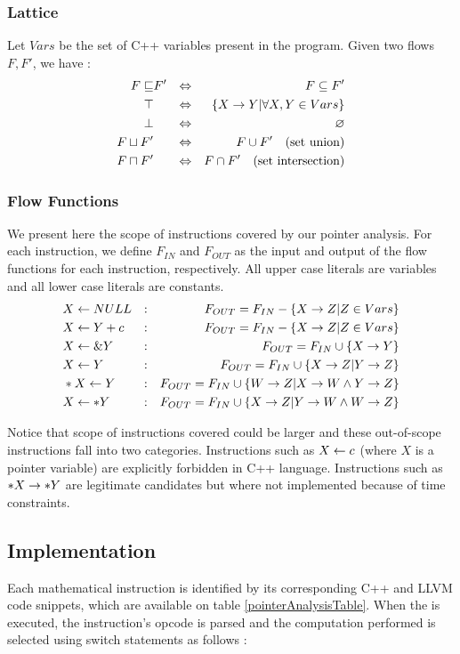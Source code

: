 \subsubsection{Lattice}
Let $Vars$ be the set of C++ variables present in the program. Given two flows $F,F'$, we have :
\begin{align*}
F \sqsubseteq & F'  & \Leftrightarrow & & F \subseteq F' \\
\top & & \Leftrightarrow & & \{ X \rightarrow Y | \forall X,Y \in Vars \}\\ 
\bot & & \Leftrightarrow & & \varnothing \\ 
F \sqcup F' & & \Leftrightarrow &  & F \cup F' \quad \text{(set union)} \\
F \sqcap F' & & \Leftrightarrow & & F \cap F' \quad \text{(set intersection)}
\end{align*}
\subsubsection{Flow Functions}
We present here the scope of instructions covered by our pointer analysis. For each instruction, we define $F_{IN}$ and $F_{OUT}$ as the input and output of the flow functions for each instruction, respectively. All upper case literals are variables and all lower case literals are constants.
{\footnotesize
\begin{align*} 
& X \leftarrow NULL & : & & F_{OUT} = F_{IN} - \{X \rightarrow Z | Z \in Vars \} \\
& X \leftarrow Y + c & : & & F_{OUT} = F_{IN} - \{X \rightarrow Z | Z \in Vars \} \\
& X \leftarrow \&Y & : & & F_{OUT} = F_{IN} \cup \{X \rightarrow Y \} \\
& X \leftarrow Y & : & & F_{OUT} = F_{IN} \cup \{X \rightarrow Z | Y \rightarrow Z \} \\
& *X \leftarrow Y & : & & F_{OUT} = F_{IN} \cup \{W \rightarrow Z | X \rightarrow W \wedge Y \rightarrow Z \} \\
& X \leftarrow *Y & : & & F_{OUT} = F_{IN} \cup \{X \rightarrow Z | Y \rightarrow W \wedge W \rightarrow Z \} 
\end{align*}
}%

Notice that scope of instructions covered could be larger and these out-of-scope instructions fall into two categories. Instructions such as $X \leftarrow c$ (where $X$ is a pointer variable) are explicitly forbidden in C++ language. Instructions such as $*X \rightarrow *Y$ are legitimate candidates but where not implemented because of time constraints. 
\subsection{Implementation}
Each mathematical instruction is identified by its corresponding C++ and LLVM code snippets, which are available on table \ref{pointerAnalysisTable}. When the  is executed, the instruction's opcode is parsed and the computation performed is selected using switch statements as follows :

